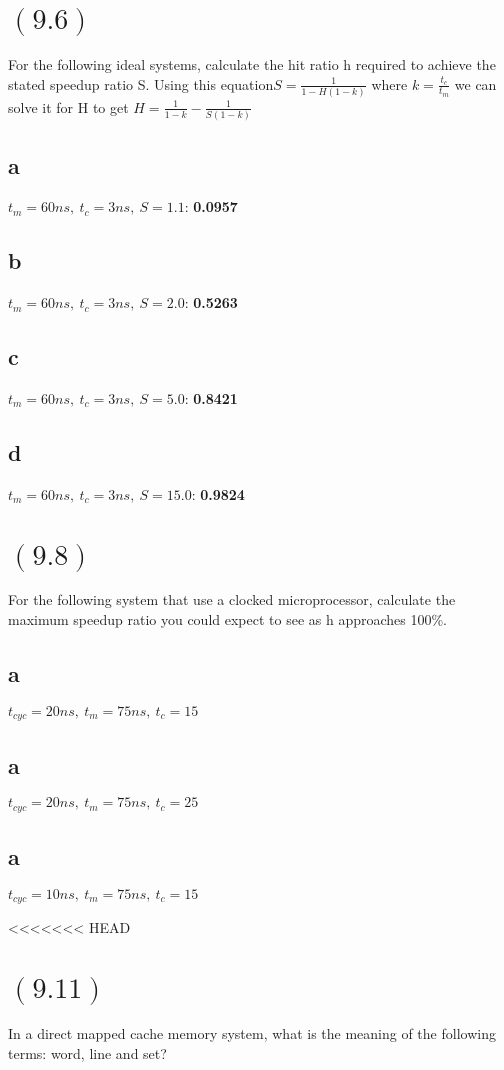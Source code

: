 \documentclass[letterpaper,12pt,titlepage]{article}
\begin{document}
\section*{$(9.6)$} For the following ideal systems, calculate the hit ratio h required to achieve the stated speedup ratio S. Using this equation$S=\frac{1}{1-H(1-k)}$ where $k=\frac{t_c}{t_m}$ we can solve it for H to get $H=\frac{1}{1-k}-\frac{1}{S(1-k)}$
\begin{mdframed}[style=MyFrame]
\subsection*{a} $t_m=60ns,~t_c=3ns,~S=1.1$: \textbf{0.0957}
\subsection*{b} $t_m=60ns,~t_c=3ns,~S=2.0$: \textbf{0.5263}
\subsection*{c} $t_m=60ns,~t_c=3ns,~S=5.0$: \textbf{0.8421}
\subsection*{d} $t_m=60ns,~t_c=3ns,~S=15.0$: \textbf{0.9824}
\end{mdframed}
\newpage
\section*{$(9.8)$} For the following system that use a clocked microprocessor, calculate the maximum speedup ratio you could expect to see as h approaches 100\%.
\begin{mdframed}[style=MyFrame]
\subsection*{a} $t_{cyc}=20ns,~t_m=75ns,~t_c=15$
\subsection*{a} $t_{cyc}=20ns,~t_m=75ns,~t_c=25$
\subsection*{a} $t_{cyc}=10ns,~t_m=75ns,~t_c=15$
\end{mdframed}

<<<<<<< HEAD
\section*{$(9.11)$} In a direct mapped cache memory system, what is the meaning of the following terms: word, line and set?
\end{document}

